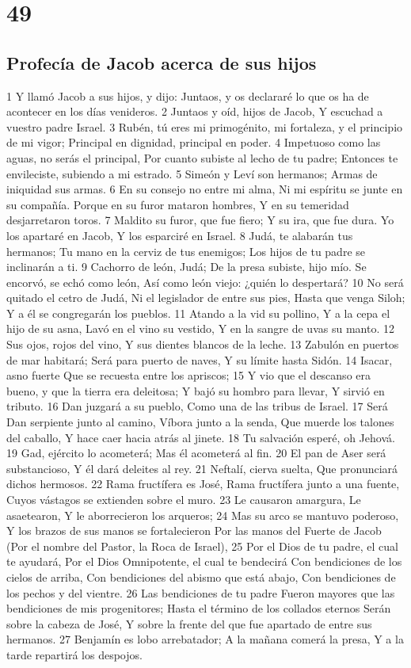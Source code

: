 \chapter{49}

\section*{Profecía de Jacob acerca de sus hijos}

1 Y llamó Jacob a sus hijos, y dijo: Juntaos, y os declararé lo que os ha de acontecer en los días venideros.
2 Juntaos y oíd, hijos de Jacob,
Y escuchad a vuestro padre Israel.
3 Rubén, tú eres mi primogénito, mi fortaleza, y el principio de mi vigor;
Principal en dignidad, principal en poder.
4 Impetuoso como las aguas, no serás el principal,
Por cuanto subiste al lecho de tu padre;
Entonces te envileciste, subiendo a mi estrado.
5 Simeón y Leví son hermanos;
Armas de iniquidad sus armas.
6 En su consejo no entre mi alma,
Ni mi espíritu se junte en su compañía.
Porque en su furor mataron hombres,
Y en su temeridad desjarretaron toros.
7 Maldito su furor, que fue fiero;
Y su ira, que fue dura.
Yo los apartaré en Jacob,
Y los esparciré en Israel.
8 Judá, te alabarán tus hermanos;
Tu mano en la cerviz de tus enemigos;
Los hijos de tu padre se inclinarán a ti.
9 Cachorro de león, Judá;
De la presa subiste, hijo mío.
Se encorvó, se echó como león,
Así como león viejo: ¿quién lo despertará?
10 No será quitado el cetro de Judá,
Ni el legislador de entre sus pies,
Hasta que venga Siloh;
Y a él se congregarán los pueblos.
11 Atando a la vid su pollino,
Y a la cepa el hijo de su asna,
Lavó en el vino su vestido,
Y en la sangre de uvas su manto.
12 Sus ojos, rojos del vino,
Y sus dientes blancos de la leche.
13 Zabulón en puertos de mar habitará;
Será para puerto de naves,
Y su límite hasta Sidón.
14 Isacar, asno fuerte
Que se recuesta entre los apriscos;
15 Y vio que el descanso era bueno, y que la tierra era deleitosa;
Y bajó su hombro para llevar,
Y sirvió en tributo.
16 Dan juzgará a su pueblo,
Como una de las tribus de Israel.
17 Será Dan serpiente junto al camino,
Víbora junto a la senda,
Que muerde los talones del caballo,
Y hace caer hacia atrás al jinete.
18 Tu salvación esperé, oh Jehová.
19 Gad, ejército lo acometerá;
Mas él acometerá al fin.
20 El pan de Aser será substancioso,
Y él dará deleites al rey.
21 Neftalí, cierva suelta,
Que pronunciará dichos hermosos.
22 Rama fructífera es José,
Rama fructífera junto a una fuente,
Cuyos vástagos se extienden sobre el muro.
23 Le causaron amargura,
Le asaetearon,
Y le aborrecieron los arqueros;
24 Mas su arco se mantuvo poderoso,
Y los brazos de sus manos se fortalecieron
Por las manos del Fuerte de Jacob
(Por el nombre del Pastor, la Roca de Israel),
25 Por el Dios de tu padre, el cual te ayudará,
Por el Dios Omnipotente, el cual te bendecirá
Con bendiciones de los cielos de arriba,
Con bendiciones del abismo que está abajo,
Con bendiciones de los pechos y del vientre.
26 Las bendiciones de tu padre
Fueron mayores que las bendiciones de mis progenitores;
Hasta el término de los collados eternos
Serán sobre la cabeza de José,
Y sobre la frente del que fue apartado de entre sus hermanos.
27 Benjamín es lobo arrebatador;
A la mañana comerá la presa,
Y a la tarde repartirá los despojos.

